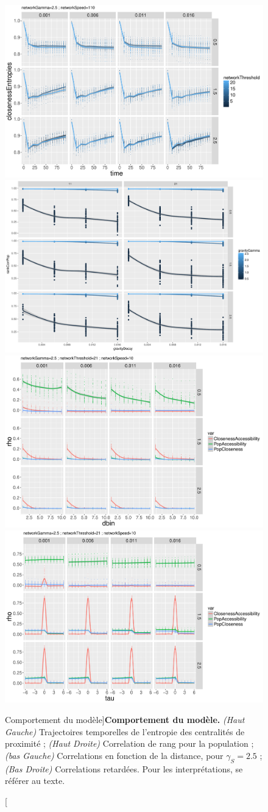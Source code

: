 \begin{figure}
	\includegraphics[width=0.48\linewidth]{Figures/MacroCoEvolExplo/closenessEntropies_networkGamma2_5_networkSpeed110}
	\includegraphics[width=0.48\linewidth]{Figures/MacroCoEvolExplo/rankCorrPop_synthRankSize0_5_networkSpeed10}\\
	\includegraphics[width=0.48\linewidth]{Figures/MacroCoEvolExplo/distcorrs_networkGamma2_5_networkThreshold21_networkSpeed10}
	\includegraphics[width=0.48\linewidth]{Figures/MacroCoEvolExplo/laggedcorrs_networkGamma2_5_networkThreshold21_networkSpeed10}
	\caption[][Comportement du modèle]{}{\textbf{Comportement du modèle.} \textit{(Haut Gauche)} Trajectoires temporelles de l'entropie des centralités de proximité ; \textit{(Haut Droite)} Correlation de rang pour la population ; \textit{(bas Gauche)} Correlations en fonction de la distance, pour $\gamma_S = 2.5$ ; \textit{(Bas Droite)} Correlations retardées. Pour les interprétations, se référer au texte.\label{fig:macrocoevolexplo:behavior}}
\end{figure}







